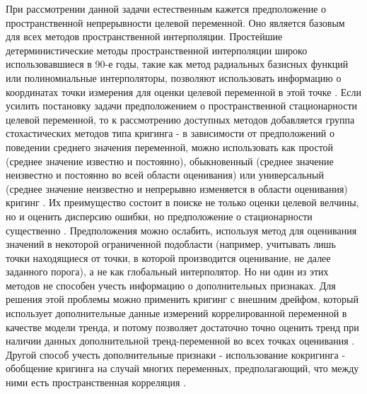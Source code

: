 \documentclass{article}
\begin{document}
При рассмотрении данной задачи естественным кажется предположение о пространственной непрерывности целевой переменной. Оно является базовым для всех методов пространственной интерполяции. Простейшие детерминистические методы пространственной интерполяции широко использовавшиеся в 90-е годы, такие как метод радиальных базисных функций или полиномиальные интерполяторы, позволяют использовать информацию о координатах точки измерения для оценки целевой переменной в этой точке \citep{kanushin2023review}. Если усилить постановку задачи предположением о пространственной стационарности целевой переменной, то к рассмотрению доступных методов добавляется группа стохастических методов типа кригинга - в зависимости от предположений о поведении среднего значения переменной, можно использовать как простой (среднее значение известно и постоянно), обыкновенный (среднее значение неизвестно и постоянно во всей области оценивания) или универсальный (среднее значение неизвестно и непрерывно изменяется в области оценивания) кригинг \citep{geostatics_book}. Их преимущество состоит в поиске не только оценки целевой велчины, но и оценить дисперсию ошибки, но предположение о стационарности существенно \citep{krukova2018spatialinterpolation}. Предположения можно ослабить, используя метод для оценивания значений в некоторой ограниченной подобласти (например, учитывать лишь точки находящиеся от точки, в которой производится оценивание, не далее заданного порога), а не как глобальный интерполятор. Но ни один из этих методов не способен учесть информацию о дополнительных признаках. Для решения этой проблемы можно применить кригинг с внешним дрейфом, который использует дополнительные данные измерений коррелированной переменной в качестве модели тренда, и потому позволяет достаточно точно оценить тренд при наличии данных дополнительной тренд-переменной во всех точках оценивания \citep{hudson1994mapping}. Другой способ учесть дополнительные признаки - использование кокригинга - обобщение кригинга на случай многих переменных, предполагающий, что между ними есть пространственная корреляция \cite{wackernagel1995multivariate}.
\end{document}

